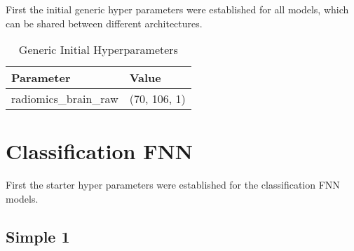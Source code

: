 \label{experiments}

First the initial generic hyper parameters were established for all models, which can be shared between different architectures.
\begin{table}[H]
\centering
\begin{tabular}{|l|l|}
\hline
\textbf{Parameter} & \textbf{Value} \\ \hline
radiomics\_brain\_raw & (70, 106, 1) \\ \hline
\end{tabular}
\caption{Generic Initial Hyperparameters}
\end{table}



\section{Classification FNN}

First the starter hyper parameters were established for the classification \ac{FNN} models.

\subsection{Simple 1}

